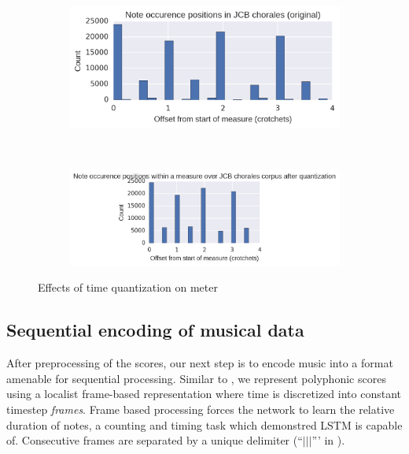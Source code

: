 \begin{figure}[tb]
    \centering
    \begin{subfigure}[t]{0.48\textwidth}
        \centering
        \includegraphics[width=1.0\linewidth]{meter-usage-original.png}
    \end{subfigure}
    ~
    \begin{subfigure}[t]{0.48\textwidth}
        \centering
        \includegraphics[width=1.0\linewidth]{meter-usage-quantized.png}
    \end{subfigure}
    \caption{Effects of time quantization on meter}
    \label{fig:meter-time-quantization}
\end{figure}

\subsection{Sequential encoding of musical data}

After preprocessing of the scores, our next step is to encode music into a
format amenable for sequential processing. Similar to
\citep{todd1989connectionist}, we represent polyphonic scores using a localist
frame-based representation where time is discretized into constant timestep
\emph{frames}. Frame based processing forces the network to learn the relative
duration of notes, a counting and timing task which \citep{gers2002learning}
demonstred LSTM is capable of. Consecutive frames are separated by a unique
delimiter (``$|||$''' in ).

